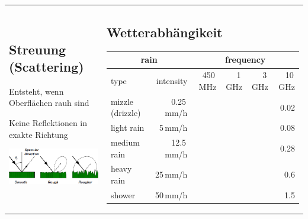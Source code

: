 \begin{tabular}{ll}
\parbox{8cm}{   
    \subsection{Streuung (Scattering) }
    \begin{liste}
        \item Entsteht, wenn Oberflächen rauh sind
        \item Keine Reflektionen in exakte Richtung
    \end{liste}
    \includegraphics[width=6cm]{./bilder/propagation-scattering.png}}
& \parbox{10cm}{
    \subsection{Wetterabhängikeit }
    \scriptsize
    \begin{tabular}{|l|r|r|r|r|r|} \hline
    \multicolumn{2}{|c|}{rain}&
    \multicolumn{4}{|c|}{frequency} \\ \hline
    type        & intensity  & 450\,MHz & 1\,GHz   &  3\,GHz  &  10\,GHz\\ 
    \hline\hline
    mizzle (drizzle)      & 0.25\,mm/h  & $2.2\cdot 10^{-8}$ & $1.5\cdot 10^{-6}$ & $1.5\cdot 10^{-4}$ & 0.02    \\ \hline
    light rain  &    5\,mm/h  & $1.0\cdot 10^{-6}$ & $2.0\cdot 10^{-5}$ & $1.0\cdot 10^{-3}$ & 0.08    \\ \hline
    medium rain & 12.5\,mm/h  & $3.0\cdot 10^{-6}$ & $7.0\cdot 10^{-5}$ & $3.0\cdot 10^{-3}$ & 0.28    \\ \hline
    heavy rain  &   25\,mm/h  & $7.5\cdot 10^{-6}$ & $1.5\cdot 10^{-4}$ & $1.0\cdot 10^{-2}$ & 0.6     \\ \hline
    shower      &   50\,mm/h  & $1.0\cdot 10^{-5}$ & $3.0\cdot 10^{-4}$ & $2.0\cdot 10^{-2}$ & 1.5     \\ \hline
    \end{tabular}
}
\end{tabular}


